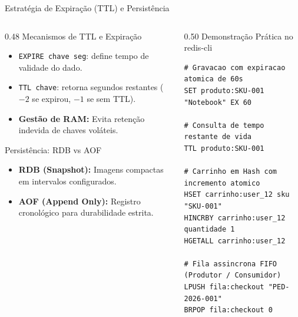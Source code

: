 \begin{frame}[fragile]{Estratégia de Expiração (TTL) e Persistência}
  \vspace{0.1cm}
  \begin{columns}[t,onlytextwidth]
    \begin{column}{0.48\textwidth}
      \alert{Mecanismos de TTL e Expiração}\par
      \footnotesize
      \begin{itemize}
        \item \lstinline[language=rediscli, basicstyle=\footnotesize\ttfamily]|EXPIRE chave seg|: define tempo de validade do dado.
        \item \lstinline[language=rediscli, basicstyle=\footnotesize\ttfamily]|TTL chave|: retorna segundos restantes ($-2$ se expirou, $-1$ se sem TTL).
        \item \textbf{Gestão de RAM:} Evita retenção indevida de chaves voláteis.
      \end{itemize}
      
      \vspace{0.15cm}
      \alert{Persistência: RDB vs AOF}\par
      \begin{itemize}
        \item \textbf{RDB (Snapshot):} Imagens compactas em intervalos configurados.
        \item \textbf{AOF (Append Only):} Registro cronológico para durabilidade estrita.
      \end{itemize}
    \end{column}
    
    \begin{column}{0.50\textwidth}
      \alert{Demonstração Prática no redis-cli}\par
      \vspace{0.05cm}
      \begin{lstlisting}[language=rediscli]
# Gravacao com expiracao atomica de 60s
SET produto:SKU-001 "Notebook" EX 60

# Consulta de tempo restante de vida
TTL produto:SKU-001

# Carrinho em Hash com incremento atomico
HSET carrinho:user_12 sku "SKU-001"
HINCRBY carrinho:user_12 quantidade 1
HGETALL carrinho:user_12

# Fila assincrona FIFO (Produtor / Consumidor)
LPUSH fila:checkout "PED-2026-001"
BRPOP fila:checkout 0
      \end{lstlisting}
    \end{column}
  \end{columns}
\end{frame}
